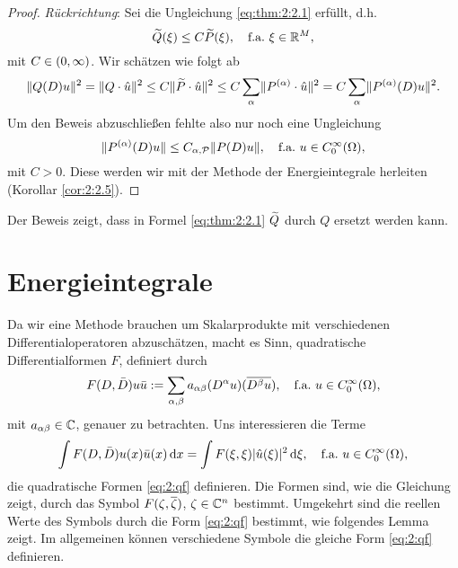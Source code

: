 \begin{proof}
{\em Rückrichtung}:
Sei die Ungleichung \eqref{eq:thm:2:2.1} erfüllt, d.h.
\begin{equation}\label{eq:2.10}
\widetilde{Q}(\xi)\leq C\widetilde{P}(\xi),
\quad\text{f.a.}~\xi\in\mathbb R^M,
\end{equation}
mit $C\in(0,\infty)$.
Wir schätzen wie folgt ab
\begin{equation}\label{eq:2.11}
\lVert Q(D)u\rVert^2=\lVert Q\cdot\hat{u}\rVert^2\leq C\lVert\widetilde{P}\cdot\hat{u}\rVert^2
\leq C\sum_{\alpha}\lVert P^{(\alpha)}\cdot\hat{u}\rVert^2=C\sum_\alpha\lVert P^{(\alpha)}(D)u\rVert^2.
\end{equation}
Um den Beweis abzuschließen fehlte also nur noch eine Ungleichung
\begin{equation}
\lVert P^{(\alpha)}(D)u\rVert\leq C_{\alpha,\mathcal P}\lVert P(D)u\rVert,
\quad\text{f.a.}~u\in C^\infty_0(\Omega),
\end{equation}
mit $C>0$.
Diese werden wir mit der Methode der Energieintegrale herleiten (Korollar \ref{cor:2:2.5}).
\end{proof}

Der Beweis zeigt,
dass in Formel \eqref{eq:thm:2:2.1} $\widetilde{Q}$ durch $Q$ ersetzt werden kann.

\section{Energieintegrale}

Da wir eine Methode brauchen um Skalarprodukte
mit verschiedenen Differentialoperatoren abzuschätzen,
macht es Sinn, quadratische Differentialformen $F$, definiert durch
\begin{equation}
F(D,\bar{D})u\bar{u}:=\sum_{\alpha,\beta}a_{\alpha\beta}(D^\alpha u)(\overline{D^\beta u}),
\quad\text{f.a.}~u\in C^\infty_0(\Omega),
\end{equation}
mit $a_{\alpha\beta}\in\mathbb C$, genauer zu betrachten.
Uns interessieren die Terme
\begin{equation}\label{eq:2:qf}
\int F(D,\bar{D})u(x)\bar{u}(x)\,\mathrm d x=\int F(\xi,\xi)\lvert\hat{u}(\xi)\rvert^2\,\mathrm d \xi,
\quad\text{f.a.}~u\in C^\infty_0(\Omega),
\end{equation}
die quadratische Formen \eqref{eq:2:qf} definieren.
Die Formen sind, wie die Gleichung zeigt,
durch das Symbol $F(\zeta,\overline{\zeta})$, $\zeta\in\mathbb C^n$ bestimmt.
Umgekehrt sind die reellen Werte des Symbols
durch die Form \eqref{eq:2:qf} bestimmt,
wie folgendes Lemma zeigt.
Im allgemeinen können verschiedene Symbole
die gleiche Form \eqref{eq:2:qf} definieren.

